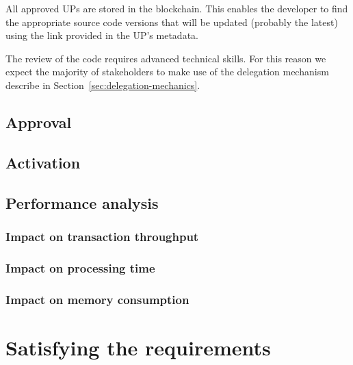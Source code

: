 \documentclass[11pt,a4paper]{article}
\begin{document}
All approved UPs are stored in the blockchain. This enables the developer to
find the appropriate source code versions that will be updated (probably the
latest) using the link provided in the UP's metadata.

The review of the code requires advanced technical skills. For this reason we
expect the majority of stakeholders to make use of the delegation mechanism
describe in Section~\ref{sec:delegation-mechanics}.

\subsection{Approval}
\label{sec:approval}

\subsection{Activation}
\label{sec:activation}


\subsection{Performance analysis}
\label{sec:performance-analysis}

\subsubsection{Impact on transaction throughput}
\label{sec:impact-trans-thro}

\subsubsection{Impact on processing time}
\label{sec:impact-proc-time}

\subsubsection{Impact on memory consumption}
\label{sec:impact-memory-cons}

\section{Satisfying the requirements}
\label{sec:satisfy-requ}
\end{document}
